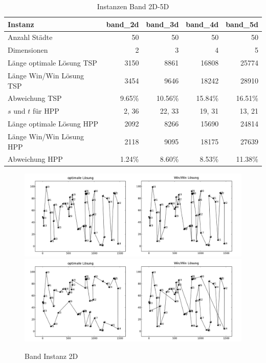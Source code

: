 \documentclass[11pt,a4paper]{article}
\begin{document}
\begin{table}[H]
        \centering
        \begin{tabular}{| l | r | r | r | r |}
            \hline
            Instanz                     & \textbf{band\_2d}     
                                        & \textbf{band\_3d}     
                                        & \textbf{band\_4d}     
                                        & \textbf{band\_5d}             \\ \hline
                Anzahl Städte               & 50        & 50       & 50         & 50        \\ \hline
                Dimensionen                 & 2         & 3        & 4          & 5         \\ \hline
                Länge optimale Lösung TSP   & 3150      & 8861     & 16808      & 25774     \\ \hline
                Länge Win/Win Lösung  TSP   & 3454      & 9646     & 18242      & 28910     \\ \hline
                Abweichung TSP              & 9.65\%    & 10.56\%  & 15.84\%    & 16.51\%   \\ \hline
                $s$ und $t$ für HPP         & 2, 36     & 22, 33   & 19, 31     & 13, 21    \\ \hline
                Länge optimale Lösung HPP   & 2092      & 8266     & 15690      & 24814     \\ \hline
                Länge Win/Win Lösung  HPP   & 2118      & 9095     & 18175      & 27639     \\ \hline
                Abweichung HPP              & 1.24\%    & 8.60\%   & 8.53\%     & 11.38\%   \\ \hline
        \end{tabular}
        \caption{Instanzen Band 2D-5D}
        \label{tab:instanzen_belt}
\end{table}

\begin{figure}[H]
    \centering
    \includegraphics[width=16cm]{gfx/belt_hpp_comparison}
    \includegraphics[width=16cm]{gfx/belt_tsp_comparison}
    \caption{Band Instanz 2D}
    \label{img:belt_comparison}
\end{figure}
\end{document}
